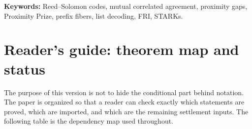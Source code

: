 \documentclass[11pt]{article}
\theoremstyle{definition}
\theoremstyle{remark}
\newcommand{\BB}{\mathbb B}
\begin{document}
\begin{abstract}
The remaining near-capacity safe side is reduced to three explicit inputs: \(Q\), prefix/quotient flatness; \(BC\), a base-field-normalized split-pencil census; and \(SP\), primitive shift-pair control.  The reductions are included: interpolation-function slope elimination, rank-one support census, two-generator lattice dichotomy, split-pencil determinantal form, moment-kernel and collision-gap formulations of \(Q\), and the finite numerator staircase.  Thus the exact Proximity Prize prediction becomes a falsifiable adjacent-pair theorem: prove the finite versions of \(Q,BC,SP\) with constants fitting the printed margins, and the first safe agreements are exactly one more than the exact unsafe agreements above.  Prove the asymptotic forms with polynomial or \(e^{o(n)}\) losses, and the Reed--Solomon MCA threshold is
\[
        \delta_C^*(\varepsilon^*)=1-\rho-g^*(\rho,\log_2|\BB|)+o(1),
        \qquad
        H_2(\rho+g^*)=(\log_2|\BB|)g^* .
\]
The manuscript is therefore a settlement program in the strict sense: every unconditional ingredient is proved, every imported statement is isolated, and every remaining proof obligation is named as a concrete finite or asymptotic Residual Input.
\end{abstract}

\medskip
\noindent\textbf{Keywords:} Reed--Solomon codes, mutual correlated agreement, proximity gaps, Proximity Prize, prefix fibers, list decoding, FRI, STARKs.

{\small\setcounter{tocdepth}{2}\tableofcontents}


\section*{Reader's guide: theorem map and status}

The purpose of this version is not to hide the conditional part behind notation.  The paper is organized so that a reader can check exactly which statements are proved, which are imported, and which are the remaining settlement inputs.  The following table is the dependency map used throughout.
\end{document}
